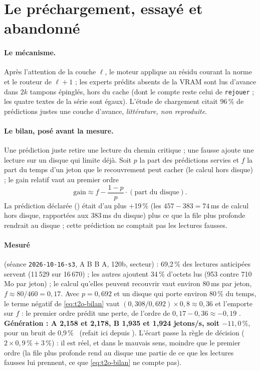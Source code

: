 \section{Le préchargement, essayé et abandonné}\label{sec:t2o-prechargement}

\paragraph{Le mécanisme.} Après l'attention de la couche $\ell$, le moteur applique au résidu courant la norme et le routeur de $\ell + 1$ ; les experts prédits absents de la VRAM sont lus d'avance dans $2k$ tampons épinglés, hors du cache (dont le compte reste celui de \texttt{rejouer} ; les quatre textes de la série sont égaux). L'étude de chargement citait 96\,\% de prédictions justes une couche d'avance, \emph{littérature, non reproduite}.

\paragraph{Le bilan, posé avant la mesure.} Une prédiction juste retire une lecture du chemin critique ; une fausse ajoute une lecture sur un disque qui limite déjà. Soit $p$ la part des prédictions servies et $f$ la part du temps d'un jeton que le recouvrement peut cacher (le calcul hors disque) ; le gain relatif vaut au premier ordre
\begin{equation}\label{eq:t2o-bilan}
\text{gain} \approx f - \frac{1 - p}{p}\cdot(\text{part du disque}).
\end{equation}
La prédiction déclarée () était d'au plus +19\,\% (les $457 - 383 = 74$\,ms de calcul hors disque, rapportées aux 383\,ms du disque) plus ce que la file plus profonde rendrait au disque ; cette prédiction ne comptait pas les lectures fausses.

\paragraph{Mesuré} (séance \texttt{2026-10-16-s3}, A B B A, 120b, secteur) : 69,2\,\% des lectures anticipées servent (11\,529 sur 16\,670) ; les autres ajoutent 34\,\% d'octets lus (953 contre 710\,Mo par jeton) ; le calcul qu'elles peuvent recouvrir vaut environ 80\,ms par jeton, $f \approx 80/460 = 0{,}17$. Avec $p = 0{,}692$ et un disque qui porte environ 80\,\% du temps, le terme négatif de \eqref{eq:t2o-bilan} vaut $(0{,}308/0{,}692) \times 0{,}8 \approx 0{,}36$ et l'emporte sur $f$ : le premier ordre prédit une perte, de l'ordre de $0{,}17 - 0{,}36 \approx -0{,}19$ \calc. \textbf{Génération : A 2,158 et 2,178, B 1,935 et 1,924 jetons/s, soit $-11{,}0\,\%$}, pour un bruit de 0,9\,\% \mes~(refait ici depuis ). L'écart passe la règle de décision ($2 \times 0{,}9\,\% + 3\,\%$) : il est réel, et dans le mauvais sens, moindre que le premier ordre (la file plus profonde rend au disque une partie de ce que les lectures fausses lui prennent, ce que \eqref{eq:t2o-bilan} ne compte pas).

